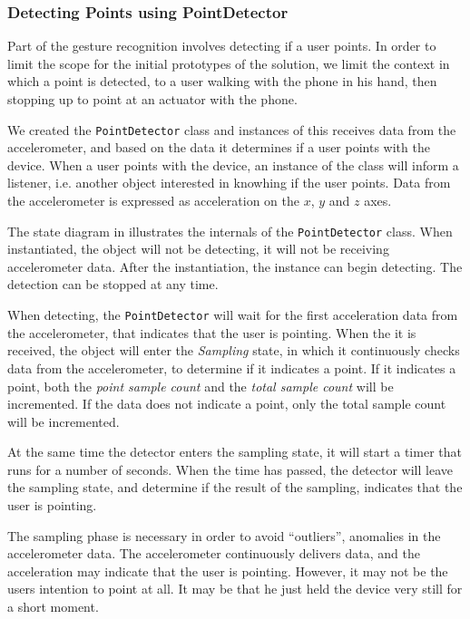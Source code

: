 \subsubsection{Detecting Points using PointDetector}

Part of the gesture recognition involves detecting if a user points. 
In order to limit the scope for the initial prototypes of the solution, 
we limit the context in which a point is detected, 
to a user walking with the phone in his hand, 
then stopping up to point at an actuator with the phone.

We created the \texttt{PointDetector} class and instances of this receives data from the accelerometer, 
and based on the data it determines if a user points with the device. 
When a user points with the device, 
an instance of the class will inform a listener, i.e. another object interested in knowhing if the user points.
Data from the accelerometer is expressed as acceleration on the $x$, $y$ and $z$ axes.

The state diagram in  illustrates the internals of the \texttt{PointDetector} class. 
When instantiated, the object will not be detecting, 
\ie it will not be receiving accelerometer data. 
After the instantiation, the instance can begin detecting. 
The detection can be stopped at any time.

When detecting, the \texttt{PointDetector} will wait for the first acceleration data from the accelerometer, 
that indicates that the user is pointing. 
When the it is received, 
the object will enter the \textit{Sampling} state, 
in which it continuously checks data from the accelerometer, 
to determine if it indicates a point. 
If it indicates a point, 
both the \emph{point sample count} and the \emph{total sample count} will be incremented. 
If the data does not indicate a point, 
only the total sample count will be incremented.

At the same time the detector enters the sampling state, 
it will start a timer that runs for a number of seconds. 
When the time has passed, 
the detector will leave the sampling state, 
and determine if the result of the sampling, 
indicates that the user is pointing. 

The sampling phase is necessary in order to avoid ``outliers'', 
\ie anomalies in the accelerometer data. 
The accelerometer continuously delivers data, 
and the acceleration may indicate that the user is pointing. 
However, it may not be the users intention to point at all. 
It may be that he just held the device very still for a short moment.

